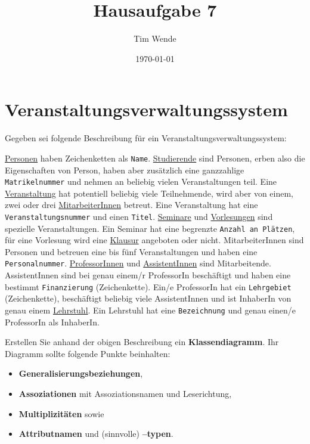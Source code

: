 \documentclass{article}
\author{Tim Wende}
\date{\today}
\title{\textbf{Hausaufgabe 7}}
\begin{document}
    \maketitle
    \section*{Veranstaltungsverwaltungssystem}

    Gegeben sei folgende Beschreibung für ein Veranstaltungsverwaltungssystem:

    \underline{Personen} haben Zeichenketten als \texttt{Name}.
    \underline{Studierende} sind Personen, erben also die Eigenschaften von Person, haben aber zusätzlich eine ganzzahlige \texttt{Matrikelnummer} und nehmen an beliebig vielen Veranstaltungen teil.
    Eine \underline{Veranstaltung} hat potentiell beliebig viele Teilnehmende, wird aber von einem, zwei oder drei \underline{MitarbeiterInnen} betreut.
    Eine Veranstaltung hat eine \texttt{Veranstaltungsnummer} und einen \texttt{Titel}.
    \underline{Seminare} und \underline{Vorlesungen} sind spezielle Veranstaltungen.
    Ein Seminar hat eine begrenzte \texttt{Anzahl an Plätzen}, für eine Vorlesung wird eine \underline{Klausur} angeboten oder nicht.
    MitarbeiterInnen sind Personen und betreuen eine bis fünf Veranstaltungen und haben eine \texttt{Personalnummer}.
    \underline{ProfessorInnen} und \underline{AssistentInnen} sind Mitarbeitende.
    AssistentInnen sind bei genau einem/r ProfessorIn beschäftigt und haben eine bestimmt \texttt{Finanzierung} (Zeichenkette).
    Ein/e ProfessorIn hat ein \texttt{Lehrgebiet} (Zeichenkette), beschäftigt beliebig viele AssistentInnen und ist InhaberIn von genau einem \underline{Lehrstuhl}.
    Ein Lehrstuhl hat eine \texttt{Bezeichnung} und genau einen/e ProfessorIn als InhaberIn.
    
    Erstellen Sie anhand der obigen Beschreibung ein \textbf{Klassendiagramm}. Ihr Diagramm sollte folgende Punkte beinhalten:
    
    \begin{itemize}
        \setlength{\itemsep}{0em}
        \item \textbf{Generalisierungsbeziehungen},
        \item \textbf{Assoziationen} mit Assoziationsnamen und Leserichtung,
        \item \textbf{Multiplizitäten} sowie
        \item \textbf{Attributnamen} und (sinnvolle) \textbf{–typen}.
    \end{itemize}
\end{document}
